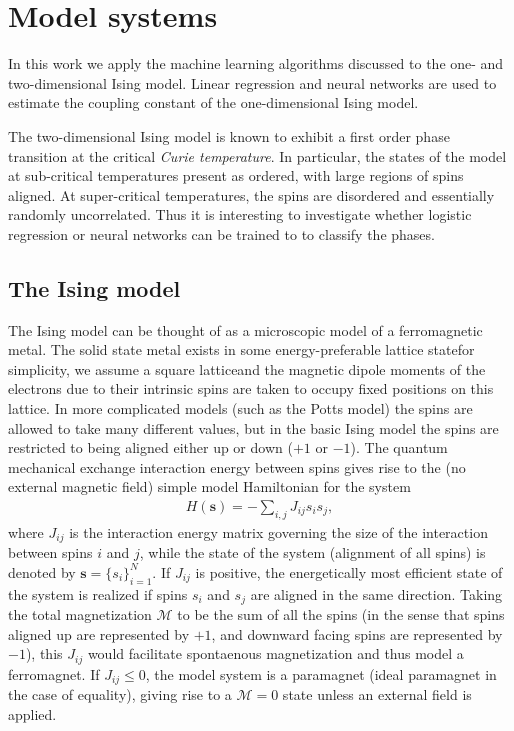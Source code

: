 \documentclass[a4paper, twocolumn]{article}
\begin{document}
\section{Model systems}
In this work we apply the machine learning algorithms discussed to the one- and two-dimensional Ising model. 
Linear regression and neural networks are used to estimate the coupling constant of the one-dimensional Ising model.

The two-dimensional Ising model is known to exhibit a first order phase transition at the critical \textit{Curie temperature}. In particular, the states of the model at sub-critical temperatures present as ordered, with large regions of spins aligned. At super-critical temperatures, the spins are disordered and essentially randomly uncorrelated. Thus it is interesting to investigate whether logistic regression or neural networks can be trained to to classify the phases. 

\subsection{The Ising model}
The Ising model can be thought of as a microscopic model of a ferromagnetic metal. The solid state metal exists in some energy-preferable lattice state\textemdash for simplicity, we assume a square lattice\textemdash and the magnetic dipole moments of the electrons due to their intrinsic spins are taken to occupy fixed positions on this lattice. In more complicated models (such as the Potts model\autocite{potts_1952}) the spins are allowed to take many different values, but in the basic Ising model the spins are restricted to being aligned either up or down ($+1$ or $-1$). The quantum mechanical exchange interaction energy between spins gives rise to the (no external magnetic field) simple model Hamiltonian for the system 
\begin{align}
H(\mathbf{s}) = -\sum_{i,j} J_{ij} s_is_j,
\end{align}
where $J_{ij}$ is the interaction energy matrix governing the size of the interaction between spins $i$ and $j$, while the state of the system (alignment of all spins) is denoted by $\mathbf{s}=\{s_i\}_{i=1}^N$. If $J_{ij}$ is positive, the energetically most efficient state of the system is realized if spins $s_i$ and $s_j$ are aligned in the same direction. Taking the total magnetization $\mathcal{M}$ to be the sum of all the spins (in the sense that spins aligned up are represented by $+1$, and downward facing spins are represented by $-1$), this $J_{ij}$ would facilitate spontaenous magnetization and thus model a ferromagnet. If $J_{ij}\le0$, the model system is a paramagnet (ideal paramagnet in the case of equality), giving rise to a $\mathcal{M}=0$ state unless an external field is applied.
\end{document}
